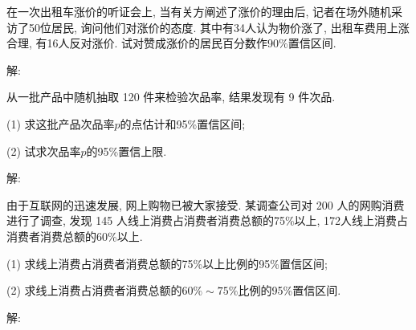 \documentclass[standard]{ExBook}
\begin{document}
\begin{qitems}
    \begin{bbox}
    \begin{shaded}
        \qitem
在一次出租车涨价的听证会上, 当有关方阐述了涨价的理由后, 记者在场外随机采访了50位居民, 询问他们对涨价的态度. 其中有34人认为物价涨了, 出租车费用上涨合理, 有16人反对涨价. 试对赞成涨价的居民百分数作90\%置信区间.
    \end{shaded}
    \end{bbox}

\vspace{-5em}

    \begin{bbox}
解: 
    \end{bbox}

\vspace{-5em}

    \begin{bbox}
    \begin{shaded}
        \qitem
从一批产品中随机抽取 120 件来检验次品率, 结果发现有 9 件次品.

(1) 求这批产品次品率$p$的点估计和95\%置信区间;

(2) 试求次品率$p$的95\%置信上限.
    \end{shaded}
    \end{bbox}

\vspace{-5em}

    \begin{bbox}
解: 
    \end{bbox}

\vspace{-5em}

    \begin{bbox}
    \begin{shaded}
        \qitem
由于互联网的迅速发展, 网上购物已被大家接受. 某调查公司对 200 人的网购消费进行了调查, 发现 145 人线上消费占消费者消费总额的75\%以上, 172人线上消费占消费者消费总额的60\%以上.

(1) 求线上消费占消费者消费总额的75\%以上比例的95\%置信区间;

(2) 求线上消费占消费者消费总额的$60\%\sim75\%$比例的95\%置信区间.
    \end{shaded}
    \end{bbox}

\vspace{-5em}

    \begin{bbox}
解: 
    \end{bbox}


\end{qitems}
\end{document}
